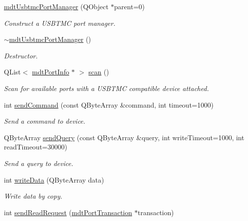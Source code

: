 \begin{DoxyCompactItemize}
\item 
\hyperlink{classmdt_usbtmc_port_manager_a99a24e4360e70ffc63677dbe888513f7}{mdtUsbtmcPortManager} (QObject $\ast$parent=0)
\begin{DoxyCompactList}\small\item\em Construct a USBTMC port manager. \end{DoxyCompactList}\item 
\hyperlink{classmdt_usbtmc_port_manager_aad6b2eef9b5cfb5c324affb6962a463b}{$\sim$mdtUsbtmcPortManager} ()
\begin{DoxyCompactList}\small\item\em Destructor. \end{DoxyCompactList}\item 
QList$<$ \hyperlink{classmdt_port_info}{mdtPortInfo} $\ast$ $>$ \hyperlink{classmdt_usbtmc_port_manager_a992d1227810186d3c7dc166452e2e3b6}{scan} ()
\begin{DoxyCompactList}\small\item\em Scan for available ports with a USBTMC compatible device attached. \end{DoxyCompactList}\item 
int \hyperlink{classmdt_usbtmc_port_manager_a86615ff2226fce0ad71c597716711898}{sendCommand} (const QByteArray \&command, int timeout=1000)
\begin{DoxyCompactList}\small\item\em Send a command to device. \end{DoxyCompactList}\item 
QByteArray \hyperlink{classmdt_usbtmc_port_manager_a20c2b18b59e64a25b75a0bad1221c3a2}{sendQuery} (const QByteArray \&query, int writeTimeout=1000, int readTimeout=30000)
\begin{DoxyCompactList}\small\item\em Send a query to device. \end{DoxyCompactList}\item 
int \hyperlink{classmdt_usbtmc_port_manager_ab7229e9d519e80a6509bec90dc9239b3}{writeData} (QByteArray data)
\begin{DoxyCompactList}\small\item\em Write data by copy. \end{DoxyCompactList}\item 
int \hyperlink{classmdt_usbtmc_port_manager_a2920bdd6b189f198f132de9e5555a78b}{sendReadRequest} (\hyperlink{classmdt_port_transaction}{mdtPortTransaction} $\ast$transaction)

\end{DoxyCompactItemize}
